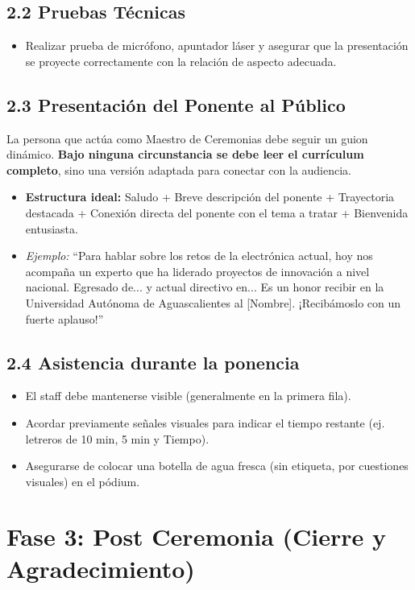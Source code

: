 \documentclass[11pt,a4paper]{article}
\begin{document}
\subsection{2.2 Pruebas Técnicas}
\begin{itemize}
    \item Realizar prueba de micrófono, apuntador láser y asegurar que la presentación se proyecte correctamente con la relación de aspecto adecuada.
\end{itemize}

\subsection{2.3 Presentación del Ponente al Público}
La persona que actúa como Maestro de Ceremonias debe seguir un guion dinámico. \textbf{Bajo ninguna circunstancia se debe leer el currículum completo}, sino una versión adaptada para conectar con la audiencia.
\begin{itemize}
    \item \textbf{Estructura ideal:} Saludo + Breve descripción del ponente + Trayectoria destacada + Conexión directa del ponente con el tema a tratar + Bienvenida entusiasta.
    \item \textit{Ejemplo:} ``Para hablar sobre los retos de la electrónica actual, hoy nos acompaña un experto que ha liderado proyectos de innovación a nivel nacional. Egresado de... y actual directivo en... Es un honor recibir en la Universidad Autónoma de Aguascalientes al [Nombre]. ¡Recibámoslo con un fuerte aplauso!''
\end{itemize}

\subsection{2.4 Asistencia durante la ponencia}
\begin{itemize}
    \item El staff debe mantenerse visible (generalmente en la primera fila).
    \item Acordar previamente señales visuales para indicar el tiempo restante (ej. letreros de 10 min, 5 min y Tiempo).
    \item Asegurarse de colocar una botella de agua fresca (sin etiqueta, por cuestiones visuales) en el pódium.
\end{itemize}

\section{Fase 3: Post Ceremonia (Cierre y Agradecimiento)}
\end{document}
